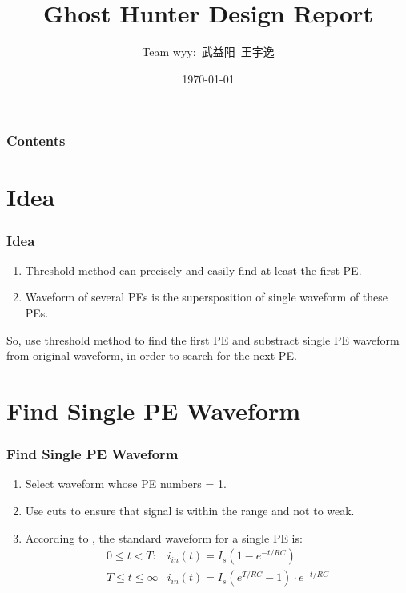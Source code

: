 \documentclass{beamer}
\title{Ghost Hunter Design Report}
\author{Team wyy:\ 武益阳\ 王宇逸}
\date{\today}
\begin{document}
\begin{frame}
    \titlepage
\end{frame}

\begin{frame}
    \frametitle{Contents}
    \tableofcontents
\end{frame}

\section{Idea}
\begin{frame}
    \frametitle{Idea}
    \large
    \begin{enumerate}
        \item Threshold method can precisely and easily find at least the first PE. \pause
        \item Waveform of several PEs is the supersposition of single waveform of these PEs. \pause
    \end{enumerate}
    
    So, use threshold method to find the first PE and substract single PE waveform from original waveform, in order to search for the next PE.
\end{frame}

\section{Find Single PE Waveform}
\begin{frame}
    \frametitle{Find Single PE Waveform}
    \large
    \begin{enumerate}
        \item Select waveform whose PE numbers = 1. \pause
        \item Use cuts to ensure that signal is within the range and not to weak. \pause
        \item According to \cite{ref1}, the standard waveform for a single PE is:\\
        \begin{equation*}
        \begin{array}{ll}{0 \leq t<T :} & {i_{i n}(t)=I_{s}\left(1-e^{-t / R C}\right)} \\ {T \leq t \leq \infty} & {i_{i n}(t)=I_{s}\left(e^{T / R C}-1\right) \cdot e^{-t / R C}}\end{array}
        \end{equation*}
    \end{enumerate}
\end{frame}
\end{document}
